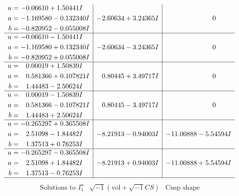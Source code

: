 \documentclass[1p]{elsarticle_modified}
\theoremstyle{definition}
\newcommand{\I}{\sqrt{-1}}
\begin{document}
$$\begin{array}{c|c|c}
\begin{aligned}
u &= -0.06610 + 1.50441 I \\
a &= -1.169580 - 0.132340 I \\
b &= -0.820952 - 0.055008 I\end{aligned}
 & -2.60634 + 3.24365 I & \phantom{-0.000000 } 0 \\ \hline\begin{aligned}
u &= -0.06610 - 1.50441 I \\
a &= -1.169580 + 0.132340 I \\
b &= -0.820952 + 0.055008 I\end{aligned}
 & -2.60634 - 3.24365 I & \phantom{-0.000000 } 0 \\ \hline\begin{aligned}
u &= \phantom{-}0.00019 + 1.50839 I \\
a &= \phantom{-}0.581366 + 0.107821 I \\
b &= \phantom{-}1.44483 - 2.50624 I\end{aligned}
 & \phantom{-}0.80445 + 3.49717 I & \phantom{-0.000000 } 0 \\ \hline\begin{aligned}
u &= \phantom{-}0.00019 - 1.50839 I \\
a &= \phantom{-}0.581366 - 0.107821 I \\
b &= \phantom{-}1.44483 + 2.50624 I\end{aligned}
 & \phantom{-}0.80445 - 3.49717 I & \phantom{-0.000000 } 0 \\ \hline\begin{aligned}
u &= -0.265297 + 0.365508 I \\
a &= \phantom{-}2.51098 - 1.84482 I \\
b &= \phantom{-}1.37513 + 0.76253 I\end{aligned}
 & -8.21913 - 0.94003 I & -11.00888 - 5.54594 I \\ \hline\begin{aligned}
u &= -0.265297 - 0.365508 I \\
a &= \phantom{-}2.51098 + 1.84482 I \\
b &= \phantom{-}1.37513 - 0.76253 I\end{aligned}
 & -8.21913 + 0.94003 I & -11.00888 + 5.54594 I\\
 \hline 
 \end{array}$$\newpage$$\begin{array}{c|c|c}  
\text{Solutions to }I^u_{1}& \I (\text{vol} + \sqrt{-1}CS) & \text{Cusp shape}\\
 \hline 
\begin{aligned}

\end{aligned}
\end{array}$$
\end{document}
